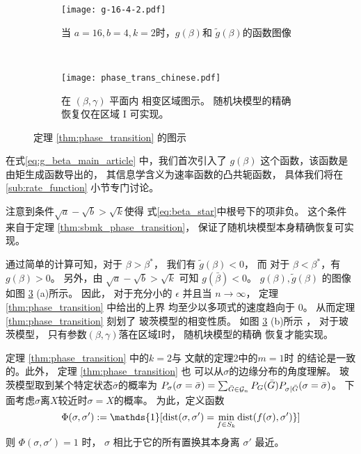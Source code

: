 \begin{figure}[H]
	\begin{subfigure}{0.43\textwidth}
		\texttt{[image: g-16-4-2.pdf]}
		\caption{当 $a=16,b=4,k=2$时，$g(\beta)$和
		$\tilde{g}(\beta)$的函数图像}\label{fig:g}
	\end{subfigure}~
	\begin{subfigure}{0.55\textwidth}
		\texttt{[image: phase\_trans\_chinese.pdf]}
		\caption{
			在 $(\beta, \gamma)$ 平面内
			相变区域图示。
			随机块模型的精确
			恢复仅在区域 I 可实现。}\label{fig:pt}
	\end{subfigure}
	\caption{定理 \ref{thm:phase_transition} 
	的图示}
	\label{fig:phase_transition_theorem_illustration}
\end{figure}
\begin{remark}
	在式\eqref{eq:g_beta_main_article} 中，我们首次引入了
	$g(\beta)$ 这个函数，该函数是由矩生成函数导出的，
	其信息学含义为速率函数的凸共轭函数，
	具体我们将在 \ref{sub:rate_function} 小节专门讨论。
\end{remark}
注意到条件$\sqrt{a} - \sqrt{b} > \sqrt{k}$使得
式\eqref{eq:beta_star}中根号下的项非负。
这个条件来自于定理 \ref{thm:sbmk_phase_transition}，
保证了随机块模型本身精确恢复可实现。


通过简单的计算可知，对于 $\beta> \beta^*$，
我们有 $\tilde{g}(\beta) < 0$，
而 对于 $\beta < \beta^*$，有
$g(\beta)>0$。
另外，由 $\sqrt{a} - \sqrt{b} > \sqrt{k}$ 可知
$g(\bar{\beta}) < 0$。
$g(\beta), \tilde{g}(\beta)$ 的图像
如图 \ref{fig:phase_transition_theorem_illustration} (a)所示。
因此， 对于充分小的
$\epsilon$ 并且当 $n \to \infty$，
定理 \ref{thm:phase_transition} 中给出的上界
均至少以多项式的速度趋向于 $0$。
从而定理 \ref{thm:phase_transition} 刻划了
玻茨模型的相变性质。
如图 \ref{fig:phase_transition_theorem_illustration} (b)所示
， 对于玻茨模型， 只有参数$(\beta, \gamma)$落在区域I时，
随机块模型的精确
恢复才能实现。



定理 \ref{thm:phase_transition} 中的$k=2$与
文献的定理2中的$m=1$时
的结论是一致的。此外，
定理 \ref{thm:phase_transition} 也
可以从$\sigma$的边缘分布的角度理解。
玻茨模型取到某个特定状态$\bar{\sigma}$的概率为
 $P_{\sigma}(\sigma =\bar{\sigma})
=\sum_{\bar{G} \in \mathcal{G}_n}P_G(\bar{G})
P_{\sigma |\bar{G}}(\sigma=\bar{\sigma})$。
下面考虑$\sigma$离$X$较近时$\sigma=X$的概率。
为此，定义函数
\begin{equation}
	\label{eq:D_sigma_sigma_prime}
\Phi(\sigma, \sigma') := \mathds{1} [ \Dist(\sigma, \sigma')  = \min_{f \in S_k} \Dist(f(\sigma), \sigma')  \}]
\end{equation}
则  $\Phi(\sigma, \sigma')=1$ 时， $\sigma$ 相比于它的所有置换其本身离 $\sigma'$ 最近。

